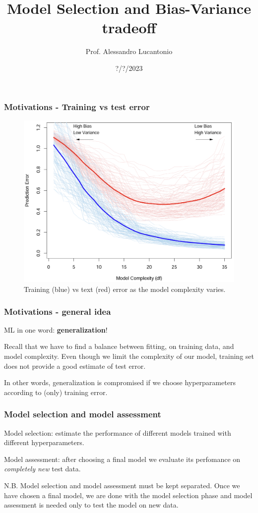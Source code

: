 \documentclass{beamer}
\title{Model Selection and Bias-Variance tradeoff}
\author{Prof. Alessandro Lucantonio}
\institute{Aarhus University - Department of Mechanical and Production Engineering}
\date{?/?/2023}
\begin{document}
	\frame{\titlepage}
	
	\begin{frame}
		\frametitle{Motivations - Training vs test error}
		\begin{figure}
			\centering
			\includegraphics[scale=0.8]{images/model_selection_general_idea}
			\caption{Training (blue) vs text (red) error as the model complexity varies.}
		\end{figure}
	\end{frame}
	
	\begin{frame}
		\frametitle{Motivations - general idea}
		ML in one word: \textbf{generalization}!
		
		\vspace{5mm}
		
		Recall that we have to find a balance between fitting, on training data, and model complexity. Even though we limit the complexity of our model, training set does not provide a good estimate of test error.
		
		\vspace{5mm}
		
		In other words, generalization is compromised if we choose hyperparameters according to (only) training error.
	\end{frame}

	\begin{frame}
		\frametitle{Model selection and model assessment}
		Model selection: estimate the performance of different models trained with different hyperparameters. 
		
		\vspace{5mm}
		
		Model assessment: after choosing a final model we evaluate its perfomance on \textsl{completely new} test data.
		
		\vspace{5mm}
		
		N.B. Model selection and model assessment must be kept separated. Once we have chosen a final model, we are done with the model selection phase and model assessment is needed only to test the model on new data.
	\end{frame}
\end{document}
